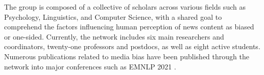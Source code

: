 The group is composed of a collective of scholars across various fields such as Psychology, Linguistics, and Computer Science, with a shared goal to comprehend the factors influencing human perception of news content as biased or one-sided. Currently, the network includes six main researchers and coordinators, twenty-one professors and postdocs, as well as eight active students. Numerous publications related to media bias have been published through the network into major conferences such as EMNLP 2021 \cite{spinde-2021-babe}.


